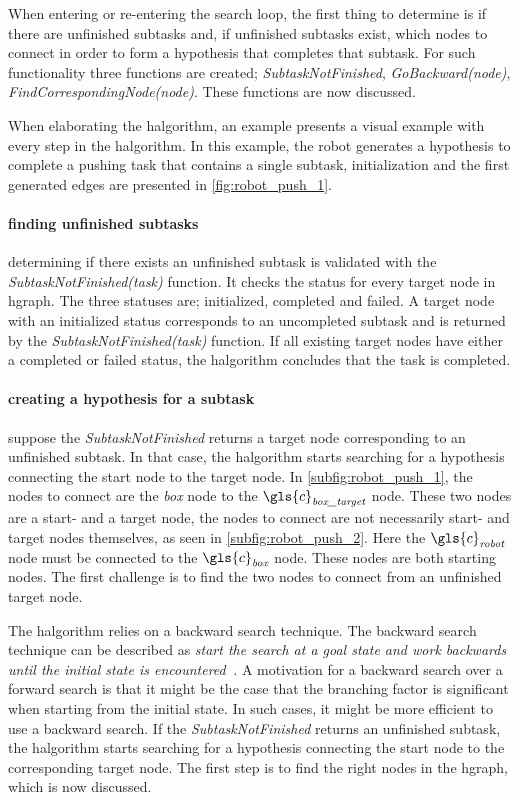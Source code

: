 When entering or re-entering the search loop, the first thing to determine is if there are unfinished subtasks and, if unfinished subtasks exist, which nodes to connect in order to form a hypothesis that completes that subtask. For such functionality three functions are created; \textit{SubtaskNotFinished}, \textit{GoBackward(\gls{node})}, \textit{FindCorrespondingNode(\gls{node})}. These functions are now discussed.\bs

When elaborating the \ac{halgorithm}, an example presents a visual example with every step in the \ac{halgorithm}. In this example, the robot generates a hypothesis to complete a pushing task that contains a single subtask, initialization and the first generated edges are presented in \cref{fig:robot_push_1}.\bs

\paragraph{finding unfinished subtasks}
determining if there exists an unfinished subtask is validated with the \textit{SubtaskNotFinished(\gls{task})} function. It checks the status for every target node in \ac{hgraph}. The three statuses are; initialized, completed and failed. A target node with an initialized status corresponds to an uncompleted subtask and is returned by the \textit{SubtaskNotFinished(\gls{task})} function. If all existing target nodes have either a completed or failed status, the \ac{halgorithm} concludes that the task is completed.\bs

\paragraph{creating a hypothesis for a subtask}
suppose the \textit{SubtaskNotFinished} returns a target node corresponding to an unfinished subtask. In that case, the \ac{halgorithm} starts searching for a hypothesis connecting the start node to the target node. In \cref{subfig:robot_push_1}, the nodes to connect are the \textit{box} node to the $\gls{c}_\textit{box\_target}$ node. These two nodes are a start- and a target node, the nodes to connect are not necessarily start- and target nodes themselves, as seen in \cref{subfig:robot_push_2}. Here the $\gls{c}_\textit{robot}$ node must be connected to the $\gls{c}_\textit{box}$ node. These nodes are both starting nodes. The first challenge is to find the two nodes to connect from an unfinished target node.\bs

 The \ac{halgorithm} relies on a backward search technique. The backward search technique can be described as \textit{start the search at a goal state and work backwards until the initial state is encountered~\cite{lavalle_planning_2006}.} A motivation for a backward search over a forward search is that it might be the case that the branching factor is significant when starting from the initial state. In such cases, it might be more efficient to use a backward search. If the \textit{SubtaskNotFinished} returns an unfinished subtask, the \ac{halgorithm} starts searching for a hypothesis connecting the start node to the corresponding target node. The first step is to find the right nodes in the \ac{hgraph}, which is now discussed.\bs

